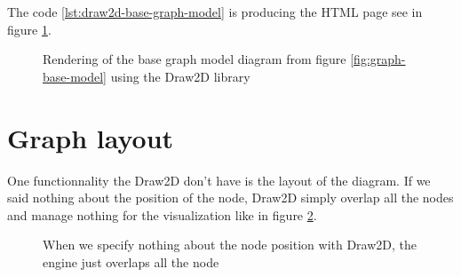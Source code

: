 The code \ref{lst:draw2d-base-graph-model} is producing the HTML page see in figure \ref{fig:base-graph-model-html-draw2d}.

\begin{figure}[h]%
    \centering
    \caption[Render of the base graph model using the Draw2D library]{Rendering of the base graph model diagram from figure \ref{fig:graph-base-model} using the Draw2D library}
    \label{fig:base-graph-model-html-draw2d}
\end{figure}%



\section{Graph layout} %
\label{sec:graph-layout}

One functionnality the Draw2D don't have is the layout of the diagram. If we said nothing about the position of the node, Draw2D simply overlap all the nodes and manage nothing for the visualization like in figure \ref{fig:draw2d_overlapping}.

\begin{figure}
  \centering
  \caption[Overlapping of nodes by Draw2D]{When we specify nothing about the node position with Draw2D, the engine just overlaps all the node}
  \label{fig:draw2d_overlapping}
\end{figure}

